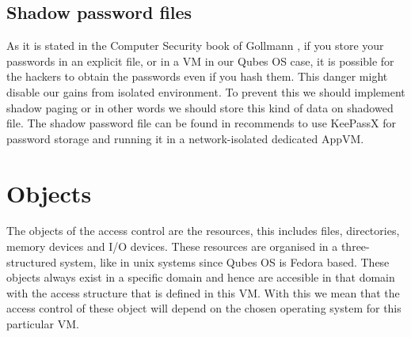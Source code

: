 \documentclass[runningheads,a4paper]{article}
\begin{document}
\subsection{Shadow password files} 
As it is stated in the Computer Security book of Gollmann
\cite{GollmannComputerSecurity}, if you store your passwords in an
explicit file, or in a VM in our Qubes OS case, it is possible for the
hackers to obtain the passwords even if you hash them.  
This danger might disable our gains from
isolated environment. To prevent this we should implement shadow
paging or in other words we should store this kind of data on shadowed file. The shadow password file can be found in %
recommends to use KeePassX for password storage and running it in a network-isolated
dedicated AppVM.  

\section{Objects}

The objects of the access control are the resources, this includes
files, directories, memory devices and I/O devices. These resources
are organised in a three-structured system, like in unix systems since Qubes OS is Fedora based.
These
objects always exist in a specific domain and hence are accesible in
that domain with the access structure that is defined in this VM. With
this we mean that the access control of these object will depend on
the chosen operating system for this particular VM. 
\end{document}
